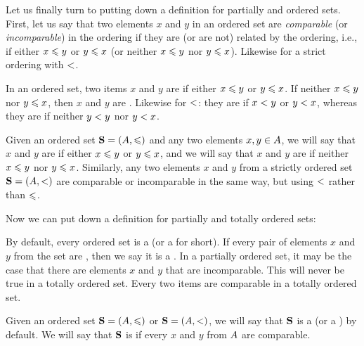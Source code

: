 \documentclass[../../../main.tex]{subfiles}
\begin{document}
Let us finally turn to putting down a definition for partially and ordered sets. First, let us say that two elements $x$ and $y$ in an ordered set are \emph{comparable} (or \emph{incomparable}) in the ordering if they are (or are not) related by the ordering, i.e., if either $x \order/ y$ or $y \order/ x$ (or neither $x \order/ y$ nor $y \order/ x$). Likewise for a strict ordering with $\strictorder/$.

\begin{terminology}
  In an ordered set, two items $x$ and $y$ are  if either $x \order/ y$ or $y \order/ x$. If neither $x \order/ y$ nor $y \order/ x$, then $x$ and $y$ are . Likewise for $\strictorder/$: they are  if $x \strictorder/ y$ or $y \strictorder/ x$, whereas they are  if neither $y \strictorder/ y$ nor $y \strictorder/ x$.
\end{terminology}

\begin{fdefinition}[Incomparability]
  \label{def:incomparability}
  Given an ordered set $\struct{S} = (\set{A}, \order/)$ and any two elements $x, y \in A$, we will say that $x$ and $y$ are  if either $x \order/ y$ or $y \order/ x$, and we will say that $x$ and $y$ are  if neither $x \order/ y$ nor $y \order/ x$. Similarly, any two elements $x$ and $y$ from a strictly ordered set $\struct{S} = (\set{A}, \strictorder/)$ are comparable or incomparable in the same way, but using $\strictorder/$ rather than $\order/$.
\end{fdefinition}

Now we can put down a definition for partially and totally ordered sets:

\begin{terminology}
  By default, every ordered set is a  (or a  for short). If every pair of elements $x$ and $y$ from the set are , then we say it is a . In a partially ordered set, it may be the case that there are elements $x$ and $y$ that are incomparable. This will never be true in a totally ordered set. Every two items are comparable in a totally ordered set.
\end{terminology}

\begin{fdefinition}
  \label{def:partial-and-total-orders}
  Given an ordered set $\struct{S} = (\set{A}, \order/)$ or $\struct{S} = (\set{A}, \strictorder/)$, we will say that $\mathbf{S}$ is a  (or a ) by default. We will say that $\mathbf{S}$ is  if every $x$ and $y$ from $A$ are comparable.
\end{fdefinition}
\end{document}
